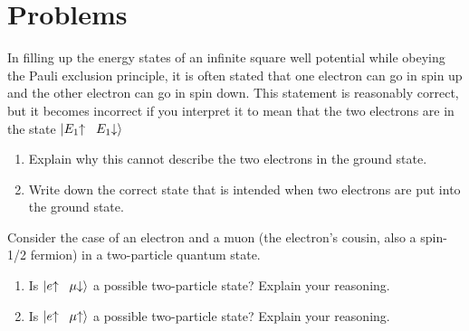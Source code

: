 \vfill

\newpage

\section*{Problems}

\begin{problem}
  In filling up the energy states of an infinite square well potential
  while obeying the Pauli
  exclusion principle, it is often stated that one
  electron can go in spin up and the other electron can go in spin
  down.  This statement is reasonably correct, but it becomes incorrect
  if you interpret it to mean that the two electrons are in the state
  $|E_1\hspace{-1mm}\uparrow \hspace{2mm} E_1\hspace{-1mm}\downarrow\rangle$
  \begin{enumerate}
  \item Explain why this cannot describe the two electrons in the
    ground state.
  \item Write down the correct state that is intended when two
    electrons are put into the ground state.
  \end{enumerate}
\end{problem}

\begin{problem}
  Consider the case of an electron and a muon (the electron's cousin,
  also a spin-1/2 fermion) in a two-particle quantum state.
  \begin{enumerate}
  \item Is $|e\hspace{-1mm}\uparrow\hspace{2mm} \mu\hspace{-1mm}\downarrow\rangle$ a possible
    two-particle state?  Explain your reasoning.
  \item Is $|e\hspace{-1mm}\uparrow\hspace{2mm} \mu\hspace{-1mm}\uparrow\rangle$ a possible
    two-particle state?  Explain your reasoning.
  \end{enumerate}
\end{problem}

